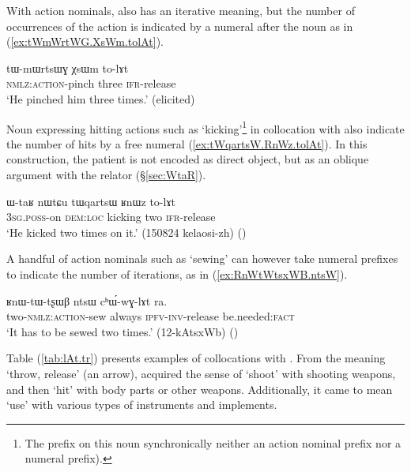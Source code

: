 With  action nominals,  also has an iterative meaning, but the number of occurrences of the action is indicated by a numeral after the noun as in (\ref{ex:tWmWrtWG.XsWm.tolAt}).

\begin{exe}
\ex \label{ex:tWmWrtWG.XsWm.tolAt}
\gll tɯ-mɯrtsɯɣ χsɯm to-lɤt \\
\textsc{nmlz}:\textsc{action}-pinch three \textsc{ifr}-release \\
\glt `He pinched him three times.' (elicited)
\end{exe}

Noun expressing hitting actions such as  `kicking'\footnote{The  prefix on this noun synchronically neither an action nominal prefix nor a numeral prefix). } in collocation with  also indicate the number of hits by a free numeral (\ref{ex:tWqartsW.RnWz.tolAt}). In this construction, the patient is not encoded as direct object, but as an oblique argument with the relator  (§\ref{sec:WtaR}).

\begin{exe}
\ex \label{ex:tWqartsW.RnWz.tolAt}
\gll ɯ-taʁ nɯtɕu tɯqartsɯ ʁnɯz to-lɤt \\
\textsc{3sg}.\textsc{poss}-on \textsc{dem}:\textsc{loc} kicking two \textsc{ifr}-release \\
\glt `He kicked two times on it.'  (150824 kelaosi-zh)
()
\end{exe}

A handful of action nominals such as  `sewing' can however take numeral prefixes to indicate the number of iterations, as in (\ref{ex:RnWtWtsxWB.ntsW}).
 
\begin{exe}
\ex \label{ex:RnWtWtsxWB.ntsW}
\gll ʁnɯ-tɯ-tʂɯβ ntsɯ cʰɯ́-wɣ-lɤt ra.   \\
two-\textsc{nmlz}:\textsc{action}-sew always \textsc{ipfv}-\textsc{inv}-release be.needed:\textsc{fact} \\
\glt `It has to be sewed two times.' (12-kAtsxWb)
()
\end{exe}
 
Table (\ref{tab:lAt.tr}) presents examples of collocations with . From the meaning `throw, release' (an arrow),  acquired the sense of `shoot' with shooting weapons, and then `hit' with body parts or other weapons. Additionally, it came to mean `use' with various types of instruments and implements.
 
